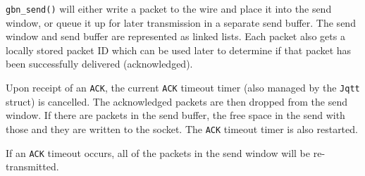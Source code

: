 \documentclass[a4paper]{article}
\numberwithin{figure}{section}
\numberwithin{table}{section}
\newcommand{\mi}{\mintinline}
\begin{document}
\mi{rust}{gbn_send()} will either write a packet to the wire and place it into the send window, or queue it up for later transmission in a separate send buffer. The send window and send buffer are represented as linked lists. Each packet also gets a locally stored packet ID which can be used later to determine if that packet has been successfully delivered (acknowledged).

Upon receipt of an \mi{c}{ACK}, the current \mi{c}{ACK} timeout timer (also managed by the \mi{rust}{Jqtt} struct) is cancelled. The acknowledged packets are then dropped from the send window. If there are packets in the send buffer, the free space in the send with those and they are written to the socket. The \mi{c}{ACK} timeout timer is also restarted.

If an \mi{c}{ACK} timeout occurs, all of the packets in the send window will be re-transmitted.

\clearpage
{}
{}
\printbibliography
\end{document}
